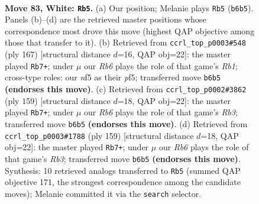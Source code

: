 \documentclass[11pt]{article}
\begin{document}
\clearpage

\begin{figure}[p]\centering
\begin{subfigure}{0.46\textwidth}\centering
\resizebox{\linewidth}{!}{%
\newchessgame
\chessboard[
  setfen={2k5/8/1R6/5n2/p6r/P6p/7K/8 w - - 24 83},
  showmover=false,
  pgfstyle=straightmove, color=movearrow, markmove={b6-b5}
]}
\caption{}
\end{subfigure}\hfill
\begin{subfigure}{0.46\textwidth}\centering
\resizebox{\linewidth}{!}{%
\newchessgame
\chessboard[
  setfen={1r6/4K2k/7P/5P1R/8/8/8/8 b - - 26 84},
  showmover=false,
  pgfstyle=straightmove, color=movearrow, markmove={b8-b7}
]}
\caption{}
\end{subfigure}
\\[4pt]
\begin{subfigure}{0.46\textwidth}\centering
\resizebox{\linewidth}{!}{%
\newchessgame
\chessboard[
  setfen={8/4K2k/1r5P/5P1R/8/8/8/8 b - - 22 80},
  showmover=false,
  pgfstyle=straightmove, color=movearrow, markmove={b6-b7}
]}
\caption{}
\end{subfigure}\hfill
\begin{subfigure}{0.46\textwidth}\centering
\resizebox{\linewidth}{!}{%
\newchessgame
\chessboard[
  setfen={8/4K2k/1r5P/5P1R/8/8/8/8 b - - 42 80},
  showmover=false,
  pgfstyle=straightmove, color=movearrow, markmove={b6-b7}
]}
\caption{}
\end{subfigure}
\caption{\textbf{Move 83, White: \texttt{Rb5}.} (a) Our position; Melanie plays \texttt{Rb5} (\texttt{b6b5}). Panels (b)--(d) are the retrieved master positions whose correspondence most drove this move (highest QAP objective among those that transfer to it). (b) Retrieved from \texttt{ccrl\_top\_p0003\#548} (ply 167) [structural distance $d$=16, QAP obj=22]: the master played \texttt{Rb7+}; under $\mu$ our \emph{Rb6} plays the role of that game's \emph{Rb1}; cross-type roles: our \emph{n}f5 as their \emph{p}f5; transferred move \texttt{b6b5} \textbf{(endorses this move)}. (c) Retrieved from \texttt{ccrl\_top\_p0002\#3862} (ply 159) [structural distance $d$=18, QAP obj=22]: the master played \texttt{Rb7+}; under $\mu$ our \emph{Rb6} plays the role of that game's \emph{Rb3}; transferred move \texttt{b6b5} \textbf{(endorses this move)}. (d) Retrieved from \texttt{ccrl\_top\_p0003\#1788} (ply 159) [structural distance $d$=18, QAP obj=22]: the master played \texttt{Rb7+}; under $\mu$ our \emph{Rb6} plays the role of that game's \emph{Rb3}; transferred move \texttt{b6b5} \textbf{(endorses this move)}. Synthesis: 10 retrieved analogs transferred to \texttt{Rb5} (summed QAP objective 171, the strongest correspondence among the candidate moves); Melanie committed it via the \texttt{search} selector.}
\label{fig:thought-m164}
\end{figure}
\end{document}
